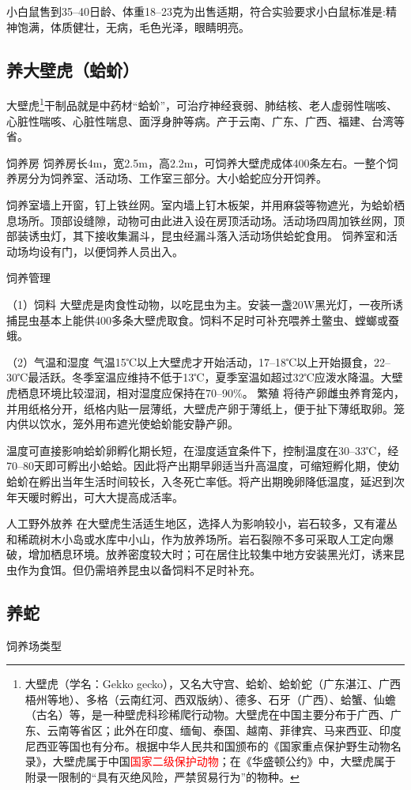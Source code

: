 \documentclass{ctexbook}
\begin{document}
小白鼠售到35--40日龄、体重18--23克为出售适期，符合实验要求小白鼠标准是:精神饱满，体质健壮，无病，毛色光泽，眼睛明亮。
\subsection{养大壁虎（蛤蚧）}
大壁虎\footnote{大壁虎（学名：Gekko gecko），又名大守宫、蛤蚧、蛤蚧蛇（广东湛江、广西梧州等地）、多格（云南红河、西双版纳）、德多、石牙（广西）、蛤蟹、仙蟾（古名）等，是一种壁虎科珍稀爬行动物。大壁虎在中国主要分布于广西、广东、云南等省区；此外在印度、缅甸、泰国、越南、菲律宾、马来西亚、印度尼西亚等国也有分布。根据中华人民共和国颁布的《国家重点保护野生动物名录》，大壁虎属于中国\textcolor{red}{国家二级保护动物}；在《华盛顿公约》中，大壁虎属于附录一限制的“具有灭绝风险，严禁贸易行为”的物种。}干制品就是中药材“蛤蚧”，可治疗神经衰弱、肺结核、老人虚弱性喘咳、心脏性喘咳、心脏性喘息、面浮身肿等病。产于云南、广东、广西、福建、台湾等省。

饲养房 饲养房长4m，宽2.5m，高2.2m，可饲养大壁虎成体400条左右。一整个饲养房分为饲养室、活动场、工作室三部分。大小蛤蛇应分开饲养。

饲养室墙上开窗，钉上铁丝网。室内墙上钉木板架，并用麻袋等物遮光，为蛤蚧栖息场所。顶部设缝隙，动物可由此进入设在房顶活动场。活动场四周加铁丝网，顶部装诱虫灯，其下接收集漏斗，昆虫经漏斗落入活动场供蛤蛇食用。 饲养室和活动场均设有门，以便饲养人员出入。

饲养管理

（1）饲料 大壁虎是肉食性动物，以吃昆虫为主。安装一盏20W黑光灯，一夜所诱捕昆虫基本上能供400多条大壁虎取食。饲料不足时可补充喂养土鳖虫、螳螂或蚕蛾。

（2）气温和湿度 气温15℃以上大壁虎才开始活动，17--18℃以上开始摄食，22--30℃最活跃。冬季室温应维持不低于13℃，夏季室温如超过32℃应泼水降温。大壁虎栖息环境比较湿润，相对湿度应保持在70--90\%。
繁殖 将待产卵雌虫养育笼内，并用纸格分开，纸格内贴一层薄纸，大壁虎产卵于薄纸上，便于扯下薄纸取卵。笼内供以饮水，笼外用布遮光使蛤蚧能安静产卵。

温度可直接影响蛤蚧卵孵化期长短，在湿度适宜条件下，控制温度在30--33℃，经70--80天即可孵出小蛤蛤。因此将产出期早卵适当升高温度，可缩短孵化期，使幼蛤蚧在孵出当年生活时间较长，入冬死亡率低。将产出期晚卵降低温度，延迟到次年天暖时孵出，可大大提高成活率。

人工野外放养 在大壁虎生活适生地区，选择人为影响较小，岩石较多，又有灌丛和稀疏树木小岛或水库中小山，作为放养场所。岩石裂隙不多可采取人工定向爆破，增加栖息环境。放养密度较大时；可在居住比较集中地方安装黑光灯，诱来昆虫作为食饵。但仍需培养昆虫以备饲料不足时补充。
\subsection{养蛇}
饲养场类型 
\end{document}
